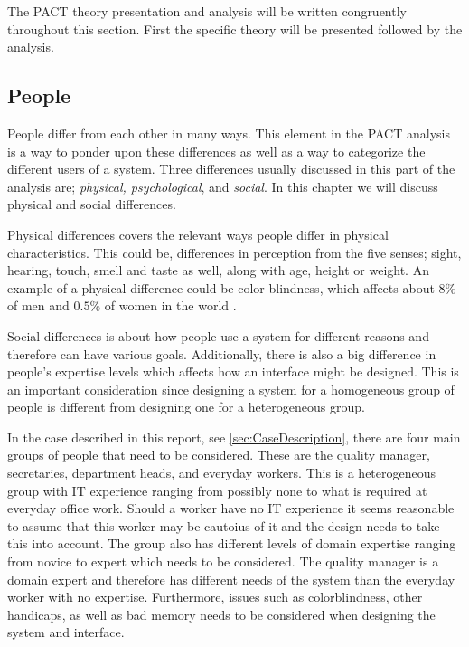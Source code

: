The PACT theory presentation and analysis will be written congruently throughout this section.
First the specific theory will be presented followed by the analysis.

\subsection{People}\label{sec:PACT-people}
People differ from each other in many ways.
This element in the PACT analysis is a way to ponder upon these differences as well as a way to categorize the different users of a system.
Three differences usually discussed in this part of the analysis are; \textit{physical, psychological}, and \textit{social}.
In this chapter we will discuss physical and social differences.

Physical differences covers the relevant ways people differ in physical characteristics.
This could be, differences in perception from the five senses; sight, hearing, touch, smell and taste as well, along with age, height or weight.
An example of a physical difference could be color blindness, which affects about $8\%$ of men and $0.5\%$ of women in the world \cite{ColourBlind}.

Social differences is about how people use a system for different reasons and therefore can have various goals.
Additionally, there is also a big difference in people's expertise levels which affects how an interface might be designed.
This is an important consideration since designing a system for a homogeneous group of people is  different from designing one for a heterogeneous group.

In the case described in this report, see \cref{sec:CaseDescription}, there are four main groups of people that need to be considered.
These are the quality manager, secretaries, department heads, and everyday workers.
This is a heterogeneous group with IT experience ranging from possibly none to what is required at everyday office work.
Should a worker have no IT experience it seems reasonable to assume that this worker may be cautoius of it and the design needs to take this into account.
The group also has different levels of domain expertise ranging from novice to expert which needs to be considered.
The quality manager is a domain expert and therefore has different needs of the system than the everyday worker with no expertise.
Furthermore, issues such as colorblindness, other handicaps, as well as bad memory needs to be considered when designing the system and interface.

